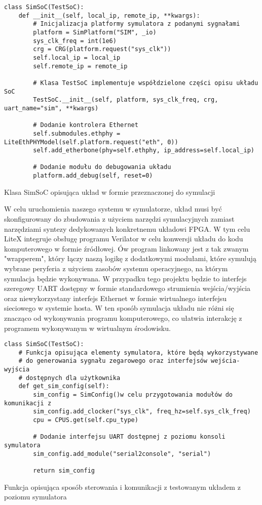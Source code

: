 \begin{listing}[H]
\begin{verbatim}
class SimSoC(TestSoC):
    def __init__(self, local_ip, remote_ip, **kwargs):
        # Inicjalizacja platformy symulatora z podanymi sygnałami
        platform = SimPlatform("SIM", _io)
        sys_clk_freq = int(1e6)
        crg = CRG(platform.request("sys_clk"))
        self.local_ip = local_ip
        self.remote_ip = remote_ip

        # Klasa TestSoC implementuje współdzielone części opisu układu SoC
        TestSoC.__init__(self, platform, sys_clk_freq, crg, uart_name="sim", **kwargs)

        # Dodanie kontrolera Ethernet
        self.submodules.ethphy = LiteEthPHYModel(self.platform.request("eth", 0))
        self.add_etherbone(phy=self.ethphy, ip_address=self.local_ip)

        # Dodanie modułu do debugowania układu
        platform.add_debug(self, reset=0)
\end{verbatim}
\caption{\label{lst:tooling-litex-sim-soc}Klasa SimSoC opisująca układ w formie przeznaczonej do symulacji}
\end{listing}

W celu uruchomienia naszego systemu w symulatorze, układ musi być skonfigurowany do zbudowania z użyciem narzędzi symulacyjnych zamiast narzędziami syntezy dedykowanych konkretnemu układowi FPGA. W tym celu LiteX integruje obsługę programu Verilator w celu konwersji układu do kodu komputerowego w formie źródłowej. Ów program linkowany jest z tak zwanym "wrapperem", który łączy naszą logikę z dodatkowymi modułami, które symulują wybrane peryferia z użyciem zasobów systemu operacyjnego, na którym symulacja będzie wykonywana. W przypadku tego projektu będzie to interfejs szeregowy UART dostępny w formie standardowego strumienia wejścia/wyjścia oraz niewykorzystany interfejs Ethernet w formie wirtualnego interfejsu sieciowego w systemie hosta. W ten sposób symulacja układu nie różni się znacząco od wykonywania programu komputerowego, co ułatwia interakcję z programem wykonywanym w wirtualnym środowisku.

\begin{listing}[H]
\begin{verbatim}
class SimSoC(TestSoC):
    # Funkcja opisująca elementy symulatora, które będą wykorzystywane
    # do generowania sygnału zegarowego oraz interfejsów wejścia-wyjścia
    # dostępnych dla użytkownika
    def get_sim_config(self):
        sim_config = SimConfig()w celu przygotowania modułów do komunikacji z
        sim_config.add_clocker("sys_clk", freq_hz=self.sys_clk_freq)
        cpu = CPUS.get(self.cpu_type)

        # Dodanie interfejsu UART dostępnej z poziomu konsoli symulatora
        sim_config.add_module("serial2console", "serial")

        return sim_config
\end{verbatim}
\caption{\label{lst:tooling-litex-sim-config}Funkcja opisująca sposób sterowania i komunikacji z testowanym układem z poziomu symulatora}
\end{listing}

